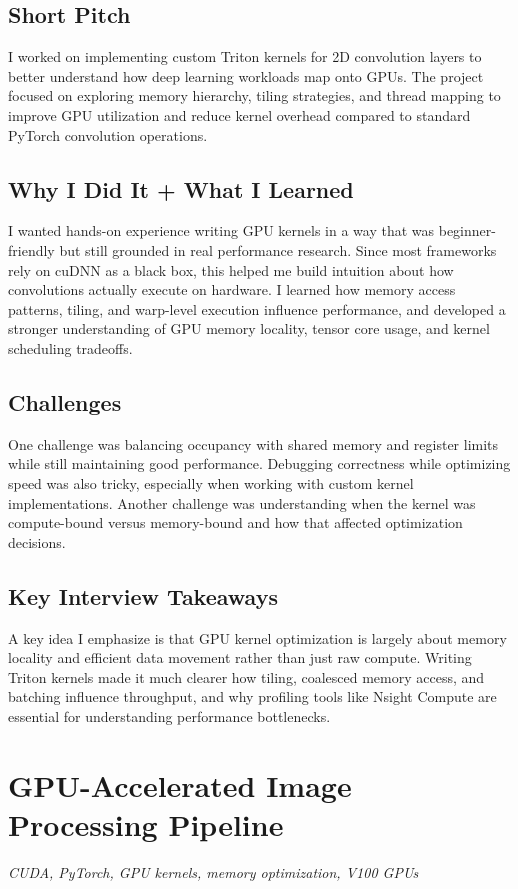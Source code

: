 \documentclass[11pt]{article}
\newcommand{\ProjectHeader}[2]{%
\section*{\textcolor{projectcolor}{#1}}%
\noindent\textit{#2}\par\vspace{0.4em}
}
\begin{document}
\subsection{Short Pitch}
I worked on implementing custom Triton kernels for 2D convolution layers to better understand how deep learning workloads map onto GPUs. The project focused on exploring memory hierarchy, tiling strategies, and thread mapping to improve GPU utilization and reduce kernel overhead compared to standard PyTorch convolution operations.

\subsection{Why I Did It + What I Learned}
I wanted hands-on experience writing GPU kernels in a way that was beginner-friendly but still grounded in real performance research. Since most frameworks rely on cuDNN as a black box, this helped me build intuition about how convolutions actually execute on hardware. I learned how memory access patterns, tiling, and warp-level execution influence performance, and developed a stronger understanding of GPU memory locality, tensor core usage, and kernel scheduling tradeoffs.

\subsection{Challenges}
One challenge was balancing occupancy with shared memory and register limits while still maintaining good performance. Debugging correctness while optimizing speed was also tricky, especially when working with custom kernel implementations. Another challenge was understanding when the kernel was compute-bound versus memory-bound and how that affected optimization decisions.

\subsection{Key Interview Takeaways}
A key idea I emphasize is that GPU kernel optimization is largely about memory locality and efficient data movement rather than just raw compute. Writing Triton kernels made it much clearer how tiling, coalesced memory access, and batching influence throughput, and why profiling tools like Nsight Compute are essential for understanding performance bottlenecks.

\ProjectHeader{GPU-Accelerated Image Processing Pipeline}{CUDA, PyTorch, GPU kernels, memory optimization, V100 GPUs}
\end{document}
